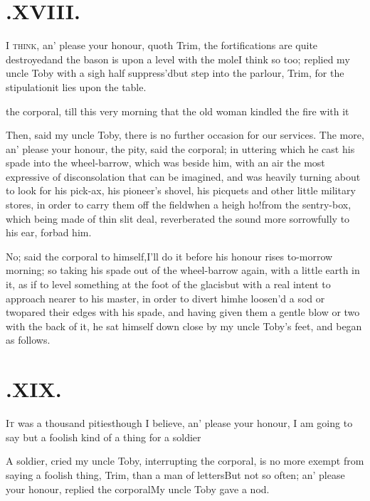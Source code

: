 \documentclass{article}
\begin{document}
\section{.\enspace XVIII.}

\lettrine{I}{ think}, an’ please your
honour, quoth Trim, the fortifications are quite
destroyed\tsh and the bason is upon a level with the
mole\tsh I think so too; replied my uncle Toby with
a sigh half suppress’d\tsh but step into the
parlour, Trim, for the stipulation\tsh it lies upon
the table.

\newpage
\noindent
{}
the corporal, till
this very morning that the old woman kindled the fire with
it\tsk

\tsk Then, said my uncle Toby, there is no
further occasion for our services. The more, an’ please your
honour, the pity, said the corporal; in uttering which he cast his
spade into the wheel-barrow, which was beside him, with an air the
most expressive of disconsolation that can be imagined, and was
heavily turning about to look for his pick-ax, his pio\-neer’s
shovel, his picquets and other little military stores, in order to
carry them off the field\tsh when a heigh ho!\@ from the
sentry-box, which being made of thin slit deal, reverberated the
sound more sorrowfully to his ear, forbad him.

\newpage
\tsk No; said the corporal to himself,\break I’ll do it
before his honour rises to-mor\-row morning; so taking his spade out
of the wheel-barrow again, with a little earth in it, as if to
level something at the foot of the glacis\tsh but with a
real intent to approach nearer to his master, in order to divert
him\tsh he loosen’d a sod or two\tsh pared
their edges with his spade, and having given them a gentle blow or
two with the back of it, he sat himself down close by my uncle
Toby’s feet, and began as follows.

\newpage
\section{.\enspace XIX.}

\lettrine{I}{t} was a thousand
pities\tsh though I believe, an’ please your honour,
I am going to say but a foolish kind of a thing for a
soldier\tsh

A soldier, cried my uncle Toby, interrupting the
corporal, is no more exempt from saying a foolish thing, Trim, than a man
of letters\tsh But not so often; an’ please your
honour, replied the corporal\tsh My uncle Toby gave
a nod.
\end{document}
